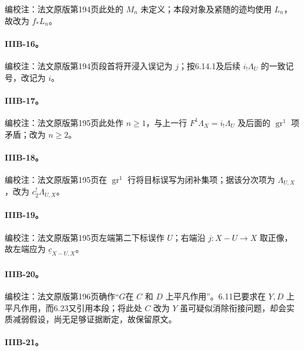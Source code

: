 编校注：法文原版第194页此处的 $M_n$ 未定义；本段对象及紧随的迹均使用 $L_n$，故改为 $f_*L_n$。

\hypertarget{collation-IIIB-16}{}

\paragraph*{IIIB-16。}

编校注：法文原版第194页段首将开浸入误记为 $j$；按6.14.1及后续 $i_!\Lambda_U$ 的一致记号，改记为 $i$。

\hypertarget{collation-IIIB-17}{}

\paragraph*{IIIB-17。}

编校注：法文原版第195页此处作 $n\ge1$，与上一行 $F^1\Lambda_X=i_!\Lambda_U$ 及后面的 $\operatorname{gr}^1$ 项矛盾；改为 $n\ge2$。

\hypertarget{collation-IIIB-18}{}

\paragraph*{IIIB-18。}

编校注：法文原版第195页在 $\operatorname{gr}^1$ 行将目标误写为闭补集项；据该分次项为 $\Lambda_{U,X}$，改为 $c_2^!\Lambda_{U,X}$。

\hypertarget{collation-IIIB-19}{}

\paragraph*{IIIB-19。}

编校注：法文原版第195页左端第二下标误作 $U$；右端沿 $j:X-U\to X$ 取正像，故左端应为 $\underline c_{X-U,X}$。

\hypertarget{collation-IIIB-20}{}

\paragraph*{IIIB-20。}

编校注：法文原版第196页确作“$G$在 $C$ 和 $D$ 上平凡作用”。6.11已要求在 $Y,D$ 上平凡作用，而6.23又引用本段；将此处 $C$ 改为 $Y$ 虽可疑似消除衔接问题，却会实质减弱假设，尚无足够证据断定，故保留原文。

\hypertarget{collation-IIIB-21}{}

\paragraph*{IIIB-21。}

